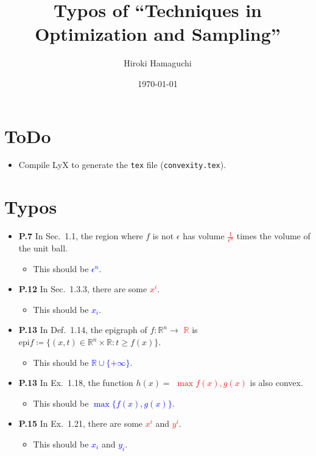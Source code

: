 \documentclass[a4paper, 10pt]{article}
\newcommand{\red}[1]{\textcolor{red}{#1}}
\newcommand{\blue}[1]{\textcolor{blue}{#1}}
\begin{document}
\title{Typos of ``Techniques in Optimization and Sampling''}
\author{Hiroki Hamaguchi}
\date{\today}
\maketitle

\section*{ToDo}
\begin{itemize}
    \item Compile LyX to generate the \texttt{tex} file (\texttt{convexity.tex}).
\end{itemize}

\section*{Typos}
\begin{itemize}
    \item \textbf{P.7} In Sec.~1.1, the region where $f$ is not $\epsilon$ has volume \red{$\frac{1}{\epsilon^n}$} times the volume of the unit ball.
          \begin{itemize}
              \item This should be \blue{$\epsilon^n$}.
          \end{itemize}

    \item \textbf{P.12} In Sec.~1.3.3, there are some \red{$x^i$}.
          \begin{itemize}
              \item This should be \blue{$x_i$}.
          \end{itemize}

    \item \textbf{P.13} In Def.~1.14, the epigraph of $f : \mathbb{R}^n \to$ \red{$\mathbb{R}$} is $\mathrm{epi} f \coloneqq \{(x,t) \in \mathbb{R}^n \times \mathbb{R} : t \geq f(x)\}$.
          \begin{itemize}
              \item This should be \blue{$\mathbb{R} \cup \{+\infty\}$}.
          \end{itemize}

    \item \textbf{P.13} In Ex.~1.18, the function $h(x) =$ \red{$\max f(x), g(x)$} is also convex.
          \begin{itemize}
              \item This should be \blue{$\max\{f(x), g(x)\}$}.
          \end{itemize}

    \item \textbf{P.15} In Ex.~1.21, there are some \red{$x^i$} and \red{$y^i$}.
          \begin{itemize}
              \item This should be \blue{$x_i$} and \blue{$y_i$}.
          \end{itemize}
\end{itemize}
\end{document}

